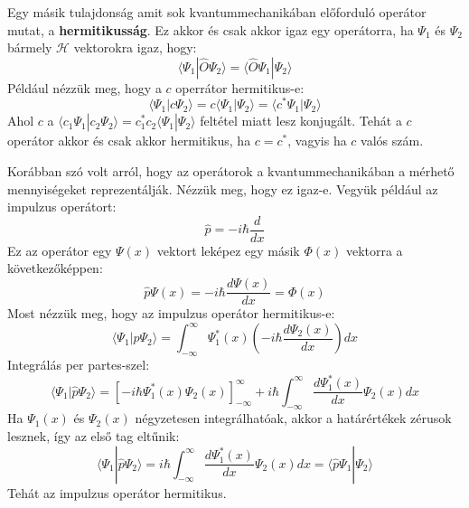 \documentclass[../main.tex]{subfiles}
\begin{document}
Egy másik tulajdonság amit sok kvantummechanikában előforduló operátor mutat, a \textbf{hermitikusság}. Ez akkor és csak akkor igaz egy operátorra, ha $\Psi_1$ és $\Psi_2$ bármely $\mathcal{H}$ vektorokra igaz, hogy:
\begin{equation}
    \langle \Psi_1 | \hat{O} \Psi_2 \rangle = \langle \hat{O} \Psi_1 | \Psi_2 \rangle
\end{equation}
Például nézzük meg, hogy a $c$ operrátor hermitikus-e:
\begin{equation}
    \langle \Psi_1 | c \Psi_2 \rangle = c\langle \Psi_1 | \Psi_2 \rangle = \langle c^*\Psi_1 | \Psi_2 \rangle
\end{equation}
Ahol $c$ a $\langle c_1 \Psi_1 | c_2 \Psi_2 \rangle = c_1^* c_2 \langle \Psi_1 | \Psi_2 \rangle$ feltétel miatt lesz konjugált. Tehát a $c$ operátor akkor és csak akkor hermitikus, ha $c = c^*$, vagyis ha $c$ valós szám.

Korábban szó volt arról, hogy az operátorok a kvantummechanikában a mérhető mennyiségeket reprezentálják. Nézzük meg, hogy ez igaz-e. Vegyük például az impulzus operátort:
\begin{equation}
    \hat{p} = -i\hbar \frac{d}{dx}
\end{equation}
Ez az operátor egy $\Psi(x)$ vektort leképez egy másik $\Phi(x)$ vektorra a következőképpen:
\begin{equation}
    \hat{p} \Psi(x) = -i\hbar \frac{d\Psi(x)}{dx} = \Phi(x)
\end{equation}
Most nézzük meg, hogy az impulzus operátor hermitikus-e:
\begin{equation}
    \langle \Psi_1 | \hat{p} \Psi_2 \rangle = \int_{-\infty}^{\infty} \Psi_1^*(x) \left(-i\hbar \frac{d\Psi_2(x)}{dx}\right) dx
\end{equation}
Integrálás per partes-szel:
\begin{equation}
    \langle \Psi_1 | \hat{p} \Psi_2 \rangle = \left[-i\hbar \Psi_1^*(x) \Psi_2(x)\right]_{-\infty}^{\infty} + i\hbar \int_{-\infty}^{\infty} \frac{d\Psi_1^*(x)}{dx} \Psi_2(x) dx
\end{equation}
Ha $\Psi_1(x)$ és $\Psi_2(x)$ négyzetesen integrálhatóak, akkor a határértékek zérusok lesznek, így az első tag eltűnik:
\begin{equation}
    \langle \Psi_1 | \hat{p} \Psi_2 \rangle = i\hbar \int_{-\infty}^{\infty} \frac{d\Psi_1^*(x)}{dx} \Psi_2(x) dx = \langle \hat{p} \Psi_1 | \Psi_2 \rangle
\end{equation}
Tehát az impulzus operátor hermitikus.
\end{document}
